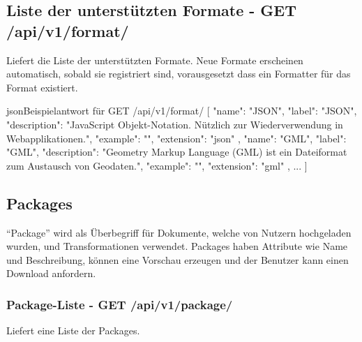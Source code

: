 \subsection{Liste der unterstützten Formate - GET /api/v1/format/} \label{sec:pd:api-format}
Liefert die Liste der unterstützten Formate. Neue Formate erscheinen automatisch, sobald sie registriert sind, vorausgesetzt dass ein Formatter für das Format existiert.

\begin{srclst}{json}{Beispielantwort für GET /api/v1/format/}
[
    {
        "name": "JSON", 
        "label": "JSON", 
        "description": "JavaScript Objekt-Notation. Nützlich zur Wiederverwendung in Webapplikationen.", 
        "example": "", 
        "extension": "json"
    }, 
    {
        "name": "GML", 
        "label": "GML", 
        "description": "Geometry Markup Language (GML) ist ein Dateiformat zum Austausch von Geodaten.", 
        "example": "", 
        "extension": "gml"
    }, 
    ...
]
\end{srclst}

\subsection{Packages}
``Package'' wird als Überbegriff für Dokumente, welche von Nutzern hochgeladen wurden, und Transformationen verwendet. Packages haben Attribute wie Name und Beschreibung, können eine Vorschau erzeugen und der Benutzer kann einen Download anfordern.

\subsubsection{Package-Liste - GET /api/v1/package/}\label{sec:pd:api-package-list}
Liefert eine Liste der Packages.

